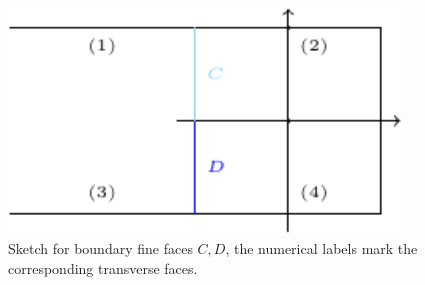 \documentclass[a4paper]{article}
\begin{document}
\begin{figure}[h]
    \centering
    \includegraphics[height=6cm]{image/fs_2D2.pdf}
    \caption{Sketch for boundary fine faces $C,D$, the numerical labels mark the corresponding transverse faces.}
    \label{fig:2Dboundary}
\end{figure}
\end{document}

